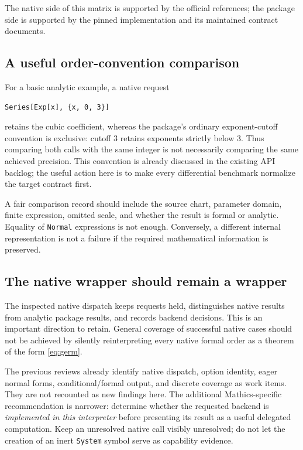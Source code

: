 \documentclass[11pt,letterpaper]{article}
\newcommand{\code}[1]{\nolinkurl{#1}}
\begin{document}
\normalsize
The native side of this matrix is supported by the official references; the
package side is supported by the pinned implementation and its maintained
contract documents. \cite{wl-series,wl-inverseseries,wl-asymptotic,wl-discrete,
repo-core,repo-native,repo-mathics,review-status}

\subsection{A useful order-convention comparison}
For a basic analytic example, a native request
\begin{lstlisting}
Series[Exp[x], {x, 0, 3}]
\end{lstlisting}
retains the cubic coefficient, whereas the package's ordinary exponent-cutoff
convention is exclusive: cutoff $3$ retains exponents strictly below $3$.
Thus comparing both calls with the same integer is not necessarily comparing
the same achieved precision. This convention is already discussed in the
existing API backlog; the useful action here is to make every differential
benchmark normalize the target contract first.
\cite{wl-series,repo-core,review-status}

A fair comparison record should include the source chart, parameter domain,
finite expression, omitted scale, and whether the result is formal or
analytic. Equality of \code{Normal} expressions is not enough. Conversely,
a different internal representation is not a failure if the required
mathematical information is preserved.

\subsection{The native wrapper should remain a wrapper}
The inspected native dispatch keeps requests held, distinguishes native
results from analytic package results, and records backend decisions.
This is an important direction to retain. General coverage of successful
native cases should not be achieved by silently reinterpreting every native
formal order as a theorem of the form \eqref{eq:germ}.
\cite{repo-native}

The previous reviews already identify native dispatch, option identity,
eager normal forms, conditional/formal output, and discrete coverage as
work items. They are not recounted as new findings here. The additional
Mathics-specific recommendation is narrower: determine whether the requested
backend is \emph{implemented in this interpreter} before presenting its
result as a useful delegated computation. Keep an unresolved native call
visibly unresolved; do not let the creation of an inert \code{System} symbol
serve as capability evidence.
\cite{review-wave3,repo-mathics,repo-mcompat}
\end{document}
